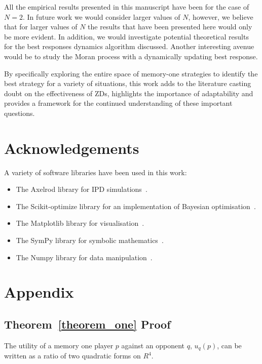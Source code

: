 \documentclass[10pt]{article}
\begin{document}
All the empirical results presented in this manuscript have been for the case of
$N=2$. In future work we would consider larger values of $N$, however, we
believe that for larger values of $N$ the results that have been presented here
would only be more evident. In addition, we would investigate potential
theoretical results for the best responses dynamics algorithm
discussed. Another interesting avenue would be to study the Moran process with a
dynamically updating best response.

By specifically exploring the entire space of memory-one strategies to identify
the best strategy for a variety of situations, this work adds to the literature
casting doubt
on the effectiveness of ZDs, highlights the importance of adaptability and provides
a framework for the continued understanding of these important questions.

\section{Acknowledgements}

A variety of software libraries have been used in this work:

\begin{itemize}
    \item The Axelrod library for IPD simulations~\cite{axelrodproject}.
    \item The Scikit-optimize library for an implementation of Bayesian optimisation~\cite{tim_head_2018_1207017}.
    \item The Matplotlib library for visualisation~\cite{hunter2007matplotlib}.
    \item The SymPy library for symbolic mathematics~\cite{sympy}.
    \item The Numpy library for data manipulation~\cite{walt2011numpy}.
\end{itemize}




\section{Appendix}

\subsection{Theorem~\ref{theorem_one} Proof}\label{appendix:theorem_one}

The utility of a memory one player \(p\) against an opponent \(q\), \(u_q(p)\),
can be written as a ratio of two quadratic forms on \(R^4\).
\end{document}
